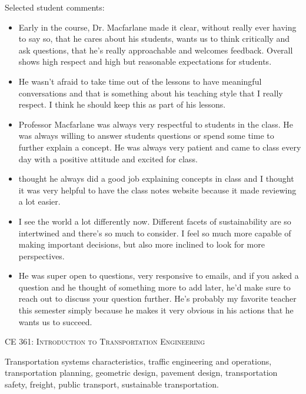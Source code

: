 \documentclass[margin,line]{res}
\newcommand{\acc}{\scshape }
\begin{document}
\begin{resume}
Selected student comments:
\begin{itemize}
  \item Early in the course, Dr. Macfarlane made it clear, without really ever
    having to say so, that he cares about his students, wants us to think
    critically and ask questions, that he's really approachable and welcomes
    feedback. Overall shows high respect and high but reasonable expectations
    for students.
  \item He wasn't afraid to take time out of the lessons to have meaningful
  conversations and that is something about his teaching style that I really
  respect. I think he should keep this as part of his lessons.
  \item Professor Macfarlane was always very respectful to students in the class. He
    was always willing to answer students questions or spend some time to
    further explain a concept. He was always very patient and came to class
    every day with a positive attitude and excited for class.
  \item thought he always did a good job explaining concepts in class and I thought it was very helpful to have the class notes website because it made reviewing a lot easier.
  \item I see the world a lot differently now. Different facets of sustainability are so intertwined and there's so much to consider. I feel so much more capable of making important decisions, but also more inclined to look for more perspectives.
  \item He was super open to questions, very responsive to emails, and if you asked a question and he thought of something more to add later, he'd make sure to reach out to discuss your question further. He's probably my favorite teacher this semester simply because he makes it very obvious in his actions that he wants us to succeed.
\end{itemize}


\fi

\vspace{.4cm}
{\acc CE 361: Introduction to Transportation Engineering}

\vspace{-.4cm}
Transportation systems characteristics, traffic engineering and operations,
transportation planning, geometric design, pavement design, transportation
safety, freight, public transport, sustainable transportation.


\end{resume}
\end{document}
